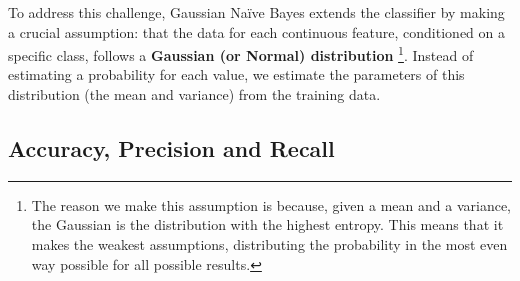 To address this challenge, Gaussian Naïve Bayes extends the classifier by making a crucial assumption: that the data for each continuous feature, conditioned on a specific class, follows a \textbf{Gaussian (or Normal) distribution}
\footnote{
 The reason we make this assumption is because, given a mean and a variance, the Gaussian is the distribution with the highest entropy. This means that it makes the weakest assumptions, distributing the probability in the most even way possible for all possible results.
}. 
Instead of estimating a probability for each value, we estimate the parameters of this distribution (the mean and variance) from the training data.


\subsection{Accuracy, Precision and Recall}
